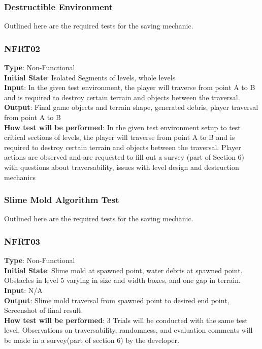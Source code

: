 \documentclass[12pt, titlepage]{article}
\begin{document}
\subsubsection{Destructible Environment}

Outlined here are the required tests for the saving mechanic.

\subsubsection{NFRT02}

\textbf{Type}: Non-Functional\\
\textbf{Initial State}: Isolated Segments of levels, whole levels\\
\textbf{Input}: In the given test environment, the player will traverse from point A to B and is required to destroy certain terrain and objects between the traversal.\\
\textbf{Output}: Final game objects and terrain shape, generated debris, player traversal from point A to B\\
\textbf{How test will be performed}: In the given test environment setup to test critical sections of levels, the player will traverse from point A to B and is required to destroy certain terrain and objects between the traversal. Player actions are observed and are requested to fill out a survey (part of Section 6) with questions about traversability, issues with level design and destruction mechanics\\
\subsubsection{Slime Mold Algorithm Test}

Outlined here are the required tests for the saving mechanic.

\subsubsection{NFRT03}

\textbf{Type}: Non-Functional\\
\textbf{Initial State}: Slime mold at spawned point, water debris at spawned point. Obstacles in level 5 varying in size and width boxes, and one gap in terrain.\\
\textbf{Input}: N/A\\
\textbf{Output}: Slime mold traversal from spawned point to desired end point, Screenshot of final result.\\
\textbf{How test will be performed}: 3 Trials will be conducted with the same test level. Observations on traversability, randomness, and evaluation comments will be made in a survey(part of section 6) by the developer.\\
\end{document}
